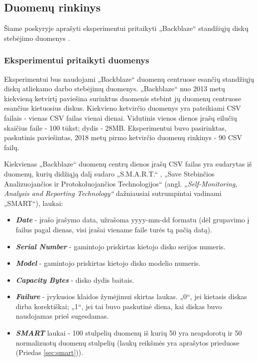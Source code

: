 \documentclass{VUMIFPSkursinis}
\begin{document}
\subsection{Duomenų rinkinys}
Šiame poskyryje aprašyti eksperimentui pritaikyti „Backblaze“ standžiųjų diskų stebėjimo duomenys \cite{backblaze}.

\subsubsection{Eksperimentui pritaikyti duomenys}
Eksperimentui bus naudojami „Backblaze“ duomenų centruose esančių standžiųjų diskų atliekamo darbo stebėjimų duomenys. „Backblaze“ nuo 2013 metų kiekvieną ketvirtį paviešina surinktus duomenis stebint jų duomenų centruose esančius kietuosius diskus. Kiekvieno ketvirčio duomenys yra pateikiami CSV failais - vienas CSV failas vienai dienai. Vidutinis vienos dienos įrašų eilučių skaičius faile - 100 tūkst; dydis - 28MB. Eksperimentui buvo pasirinktas, paskutinis paviešintas, 2018 metų pirmo ketvirčio duomenų rinkinys \cite{backblaze} - 90 CSV failų.

Kiekvienas „Backblaze“ duomenų centrų dienos įrašų CSV failas yra sudarytas iš duomenų, kurių didžiąją dalį sudaro „S.M.A.R.T.“ \cite{smart_meaning}, „Save Stebinčios Analizuojančios ir Protokoluojančios Technologijos“ (angl. \textit{„Self-Monitoring, Analysis and Reporting Technology“} dažniausiai sutrumpintai vadinami „SMART“), laukai:

\begin{itemize}
\item \textit{\textbf{Date}} - įrašo įrašymo data, užrašoma yyyy-mm-dd formatu (dėl grupavimo į failus pagal dienas, visi įrašai viename faile turės tą pačią datą).
\item \textit{\textbf{Serial Number}} - gamintojo priskirtas kietojo disko serijos numeris.
\item \textit{\textbf{Model}} - gamintojo priskirtas kietojo disko modelio numeris.
\item \textit{\textbf{Capacity Bytes}} - disko dydis baitais.
\item \textit{\textbf{Failure}} - įvykusios klaidos žymėjimui skirtas laukas. „0“, jei kietasis diskas dirba korektiškai; „1“, jei tai buvo paskutinė diena, kai diskas buvo naudojamas prieš sugesdamas.
\item \textit{\textbf{SMART}} laukai - 100 stulpelių duomenų iš kurių 50 yra neapdorotų ir 50 normalizuotų duomenų stulpelių (laukų reikšmės yra aprašytos prieduose (Priedas \ref{sec:smart})).
\end{itemize}
\end{document}
